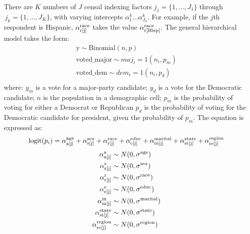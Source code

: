 There are $K$ numbers of $J$ censal indexing factors $j_{1}=\{1,\ldots ,J_{1}\}$ through $\,j_{k}=\{1,\ldots ,J_{K}\}$, with varying intercepts $\alpha_{1}^{k}\ldots \alpha_{J_{k}}^{k}$. For example, if the $j$th respondent is Hispanic, $\alpha_{\rm r[j]}^{\rm race}$ takes the value {$\alpha_{\rm r[Hisp]}^{\rm race}$}. The general hierarchical model takes the form:
\begin{gather*}
\text{y} \sim \text{Binomial} (n, p)\\
\text{voted\_major}  \sim maj_i = 1 (n_i, p_m)\\
\text{voted\_dem}  \sim dem_i = 1 (n_i, p_d)\\
\end{gather*}
where: \newline 
$y_m$ is a vote for a major-party candidate;\newline
$y_d$ is a vote for the Democratic candidate; \newline
$n$ is the population in a demographic cell; \newline 
$p_m$ is the probability of voting for either a Democrat or Republican \newline 
$p_d$ is the probability of voting for the Democratic candidate for president, \newline given the probability of $p_m$. The equation is expressed as:
\begin{gather*}
\text{logit} (p_i) = \alpha_{\rm a[j]}^{\rm age}
+ \alpha_{\rm s[j]}^{\rm sex}
+ \alpha_{\rm r[j]}^{\rm race}
+ \alpha_{\rm e[j]}^{\rm educ}
+ \alpha_{\rm m[j]}^{\rm marital}
+ \alpha_{\rm st[j]}^{\rm state}
+ \alpha_{\rm re[j]}^{\rm region}
\end{gather*}
\begin{align*}
\alpha_{\rm a[j]}^{\rm a} & \sim N(0,\sigma^{\rm age})\\
\alpha_{\rm s[j]}^{\rm s} & \sim N(0,\sigma^{\rm sex})\\
\alpha_{\rm r[j]}^{\rm r} & \sim N(0,\sigma^{\rm race})\\
\alpha_{\rm e[j]}^{\rm e} & \sim N(0,\sigma^{\rm educ})\\
\alpha_{\rm m[j]}^{\rm m} & \sim N(0,\sigma^{\rm marital})\\
\alpha_{\rm st[j]}^{\rm state} & \sim N(0,\sigma^{\rm state})\\
\alpha_{\rm re[j]}^{\rm region} & \sim N(0,\sigma^{\rm region})
\end{align*}
 

